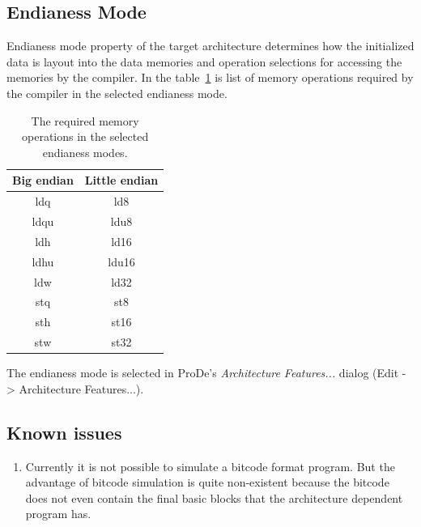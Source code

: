 \documentclass[a4paper,twoside]{tceusermanual}
\begin{document}
\subsection{Endianess Mode}
\label{ss:endianess-mode}

Endianess mode property of the target architecture determines how the
initialized data is layout into the data memories and operation
selections for accessing the memories by the compiler. In the
table~\ref{table:mem-ops-for-endianess-modes} is list of memory
operations required by the compiler in the selected endianess
mode.

\begin{table}
\begin{center}
  \begin{tabular}{|c|c|}
    \hline
    Big endian & Little endian \\
    \hline
    ldq & ld8 \\
    ldqu & ldu8 \\
    ldh & ld16 \\
    ldhu & ldu16 \\
    ldw & ld32 \\
    stq & st8 \\
    sth & st16 \\
    stw & st32 \\
    \hline
  \end{tabular}
\end{center}
\caption{The required memory operations in the selected endianess modes.}
\label{table:mem-ops-for-endianess-modes}
\end{table}

The endianess mode is selected in ProDe's \emph{Architecture
  Features...}  dialog (Edit -> Architecture Features...).


\subsection{Known issues}
\label{sec:oaccIssues}
\begin{enumerate}

\item
Currently it is not possible to simulate a bitcode format program. But the
advantage of bitcode simulation is quite non-existent because the bitcode
does not even contain the final basic blocks that the architecture dependent
program has.
\end{enumerate}

\end{document}
